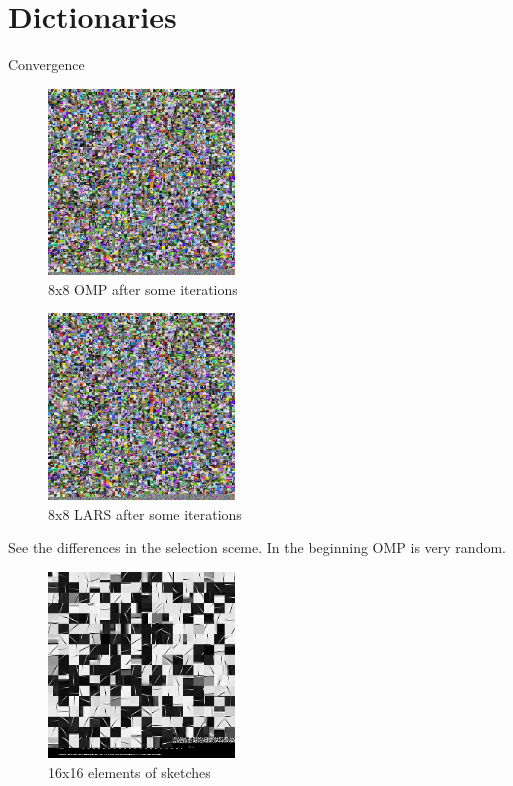 \section{Dictionaries}

Convergence

\begin{figure}
\centering
\includegraphics[width = 0.44\textwidth]{images/8_4000_10000_10_lasso.png} 
\caption{8x8 OMP after some iterations}
\label{fig:8_4000_lasso}
\end{figure}

\begin{figure}
\centering
\includegraphics[width = 0.44\textwidth]{images/8_4000_10000_10_lasso.png} 
\caption{8x8 LARS after some iterations}
\label{fig:8_4000_lasso}
\end{figure}

See the differences in the selection sceme.
In the beginning OMP is very random.

\begin{figure}
\centering
\includegraphics[width = 0.44\textwidth]{images/16_1000_5000_10lasso_sketches.png}
\caption{16x16 elements of sketches}
\label{fig:16_1000_lasso}
\end{figure}

